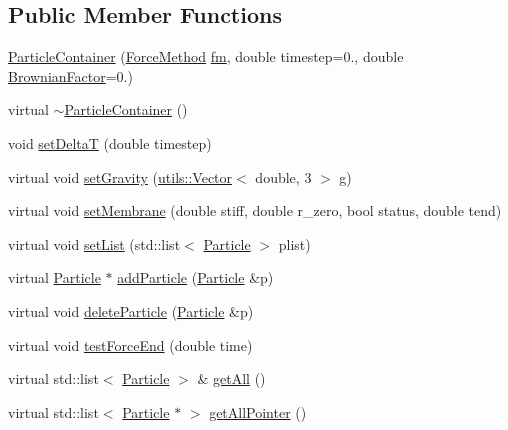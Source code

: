 \subsection*{Public Member Functions}
\begin{DoxyCompactItemize}
\item 
\hyperlink{classParticleContainer_a64a701a902e5a4e97ae04acb9d63e20a}{Particle\+Container} (\hyperlink{classParticleContainer_a2457078eafdf0fdd9eeb977e63aed6e8}{Force\+Method} \hyperlink{classParticleContainer_a839c3ff474bfece04fcbb0ca3fe9a0f8}{fm}, double timestep=0., double \hyperlink{classParticleContainer_a64e8a768554b5b6126755e8a8e85f2f5}{Brownian\+Factor}=0.)
\item 
virtual \hyperlink{classParticleContainer_a9629a8d31a3aa8c2fe944307c1263b66}{$\sim$\+Particle\+Container} ()
\item 
void \hyperlink{classParticleContainer_aac74c7e039e9c6342bcbab8b20dd1b06}{set\+DeltaT} (double timestep)
\item 
virtual void \hyperlink{classParticleContainer_af7fe938fddd10136945f99625e141149}{set\+Gravity} (\hyperlink{classutils_1_1Vector}{utils\+::\+Vector}$<$ double, 3 $>$ g)
\item 
virtual void \hyperlink{classParticleContainer_abdd289393fe11f1192a9eb79b01b2680}{set\+Membrane} (double stiff, double r\+\_\+zero, bool status, double tend)
\item 
virtual void \hyperlink{classParticleContainer_ae3f61f4d99b06782cfd978779ccc13bf}{set\+List} (std\+::list$<$ \hyperlink{classParticle}{Particle} $>$ plist)
\item 
virtual \hyperlink{classParticle}{Particle} $\ast$ \hyperlink{classParticleContainer_a13b860c91defffff1404e8e3c12766a8}{add\+Particle} (\hyperlink{classParticle}{Particle} \&p)
\item 
virtual void \hyperlink{classParticleContainer_a27c73f4106a4e38382dbf461e03bb5f1}{delete\+Particle} (\hyperlink{classParticle}{Particle} \&p)
\item 
virtual void \hyperlink{classParticleContainer_ae132e846bb2763712d4acca3095bcbfc}{test\+Force\+End} (double time)
\item 
virtual std\+::list$<$ \hyperlink{classParticle}{Particle} $>$ \& \hyperlink{classParticleContainer_a5b96e023a5b3c2507766cefa8f006c65}{get\+All} ()
\item 
virtual std\+::list$<$ \hyperlink{classParticle}{Particle} $\ast$ $>$ \hyperlink{classParticleContainer_a52ebfc06d0daa96fbeef945b43e4fe00}{get\+All\+Pointer} ()
\item 

\end{DoxyCompactItemize}
